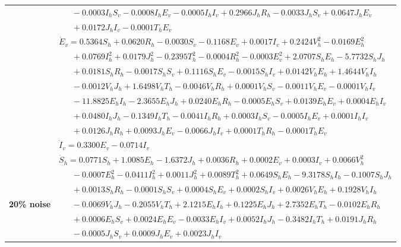 \documentclass[9pt]{article}
\numberwithin{equation}{section}
\begin{document}
\begin{table}[ht]
\begin{tabularx}{1\linewidth}{|l|X|}
        & $\quad\;\;-0.0003I_hS_v-0.0008I_hE_v-0.0005I_hI_v+0.2966J_hR_h-0.0033J_hS_v+0.0647J_hE_v$ \\
        & $\quad\;\;+0.0172J_hI_v-0.0001T_hE_v$ \\
        & $\dot{E}_v=0.5364S_h+0.0620R_h-0.0030S_v-0.1168E_v+0.0017I_v+0.2424V_h^2-0.0169E_h^2$ \\
        & $\quad\;\;+0.0769I_h^2+0.0179J_h^2-0.2395T_h^2-0.0004R_h^2-0.0003E_v^2+2.0707S_hE_h-5.7732S_hJ_h$ \\
        & $\quad\;\;+0.0181S_hR_h-0.0017S_hS_v+0.1116S_hE_v-0.0015S_hI_v+0.0142V_hE_h+1.4644V_hI_h$ \\
        & $\quad\;\;-0.0012V_hJ_h+1.6498V_hT_h-0.0046V_hR_h+0.0001V_hS_v-0.0011V_hE_v-0.0001V_hI_v$ \\
        & $\quad\;\;-11.8825E_hI_h-2.3655E_hJ_h+0.0240E_hR_h-0.0005E_hS_v+0.0139E_hE_v+0.0004E_hI_v$ \\
        & $\quad\;\;+0.0480I_hJ_h-0.1349I_hT_h-0.0041I_hR_h+0.0003I_hS_v-0.0005I_hE_v+0.0001I_hI_v$ \\
        & $\quad\;\;+0.0126J_hR_h+0.0093J_hE_v-0.0066J_hI_v+0.0001T_hR_h-0.0001T_hE_v$ \\
        & $\dot{I}_v=0.3300E_v-0.0714I_v$ \\
        \hline\hline
        & 
        $\dot{S}_h=0.0771S_h+1.0085E_h-1.6372J_h+0.0036R_h+0.0002E_v+0.0003I_v+0.0066V_h^2$ \\
        & $\quad\;\;-0.0007E_h^2-0.0411I_h^2+0.0011J_h^2+0.0089T_h^2+0.0649S_hE_h-9.3178S_hI_h-0.1007S_hJ_h$ \\
        & $\quad\;\;+0.0013S_hR_h-0.0001S_hS_v+0.0004S_hE_v+0.0002S_hI_v+0.0026V_hE_h+0.1928V_hI_h$ \\
        \textbf{20\% noise} & $\quad\;\;-0.0069V_hJ_h-0.2055V_hT_h+2.1215E_hI_h+0.1225E_hJ_h+2.7352E_hT_h-0.0102E_hR_h$ \\
        & $\quad\;\;+0.0006E_hS_v+0.0024E_hE_v-0.0033E_hI_v+0.0052I_hJ_h-0.3482I_hT_h+0.0191J_hR_h$ \\
        & $\quad\;\;-0.0005J_hS_v+0.0009J_hE_v+0.0023J_hI_v$ \\
    \end{tabularx}
\end{table}
\end{document}
